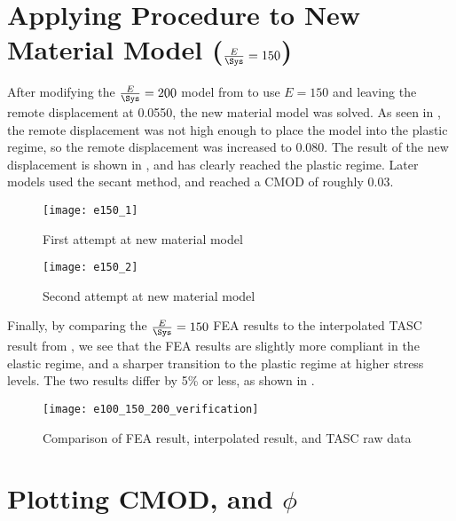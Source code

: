 \section{Applying Procedure to New Material Model (\(\frac{E}{\Sys} = 150\))}

After modifying the \(\frac{E}{\Sys} = 200\) model from  to use \(E = 150\) and leaving the remote displacement at 0.0550, the new material model was solved.
As seen in , the remote displacement was not high enough to place the model into the plastic regime, so the remote displacement was increased to 0.080.
The result of the new displacement is shown in , and has clearly reached the plastic regime.
Later models used the secant method, and reached a CMOD of roughly 0.03.
\begin{frame}
\begin{figure}[tbp]
\centering
\texttt{[image: e150\_1]}
\caption{\label{fig:e150_1} First attempt at new material model}
\end{figure}
\end{frame}
\begin{frame}
\begin{figure}[tbp]
\centering
\texttt{[image: e150\_2]}
\caption{\label{fig:e150_2} Second attempt at new material model}
\end{figure}
\end{frame}

Finally, by comparing the \(\frac{E}{\Sys} = 150\) FEA results to the interpolated TASC result from , we see that the FEA results are slightly more compliant in the elastic regime, and a sharper transition to the plastic regime at higher stress levels.
The two results differ by 5\% or less, as shown in .
\begin{frame}
\begin{figure}[tbp]
\centering
\texttt{[image: e100\_150\_200\_verification]}
\caption{\label{fig:e100_150_200_verification} Comparison of FEA result, interpolated result, and TASC raw data}
\end{figure}
\end{frame}

\section{Plotting CMOD, \J and \(\phi\)}

